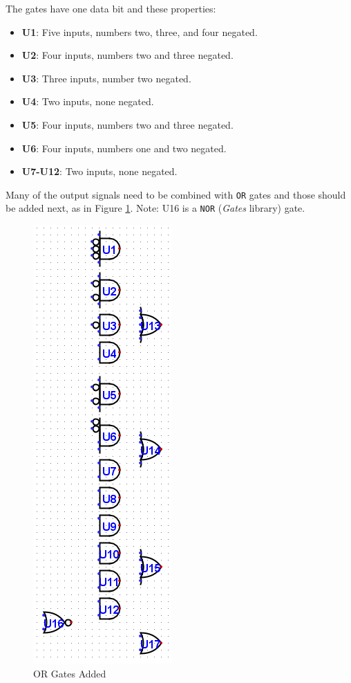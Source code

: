 The gates have one data bit and these properties:

\begin{itemize}
	\item \textbf{U1}: Five inputs, numbers two, three, and four negated.
	\item \textbf{U2}: Four inputs, numbers two and three negated.
	\item \textbf{U3}: Three inputs, number two negated.
	\item \textbf{U4}: Two inputs, none negated.
	\item \textbf{U5}: Four inputs, numbers two and three negated.
	\item \textbf{U6}: Four inputs, numbers one and two negated.
	\item \textbf{U7-U12}: Two inputs, none negated. 
\end{itemize}

Many of the output signals need to be combined with \texttt{OR} gates and those should be added next, as in Figure \ref{fig:encode-02}. Note: U16 is a \texttt{NOR} (\textit{Gates} library) gate.

\begin{figure}[H]
	\centering
	\includegraphics[width=\maxwidth{.95\linewidth}]{gfx/encode-02}
	\caption{OR Gates Added}
	\label{fig:encode-02}
\end{figure}


